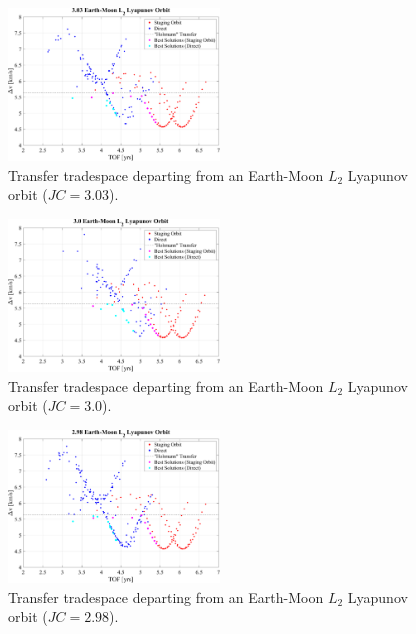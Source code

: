 \begin{figure}[ht]
    \centering
    \includegraphics[width=0.5\textwidth]{figures/TradeSpace_L2Lyapunov_3_03.pdf}
    \caption{Transfer tradespace departing from an Earth-Moon $L_{2}$ Lyapunov orbit ($JC=3.03$).}
\end{figure}
\clearpage

\begin{figure}[ht]
    \centering
    \includegraphics[width=0.5\textwidth]{figures/TradeSpace_L2Lyapunov_3_00.pdf}
    \caption{Transfer tradespace departing from an Earth-Moon $L_{2}$ Lyapunov orbit ($JC=3.0$).}
\end{figure}

\begin{figure}[ht]
    \centering
    \includegraphics[width=0.5\textwidth]{figures/TradeSpace_L2Lyapunov_2_98.pdf}
    \caption{Transfer tradespace departing from an Earth-Moon $L_{2}$ Lyapunov orbit ($JC=2.98$).}
\end{figure}
\clearpage

